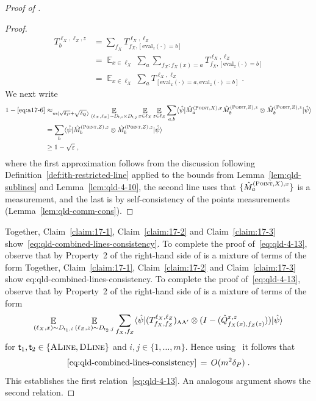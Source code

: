 \documentclass[11pt]{article}
\theoremstyle{definition}
\newcommand{\ket}[1]{|#1\rangle}
\newcommand{\bra}[1]{\langle#1|}
\DeclareMathOperator*{\Expectation}{\mathbb{E}}
\newcommand{\Es}[1]{\Expectation_{#1}}
\newcommand{\ot}{\otimes}
\newcommand{\eps}{\varepsilon}
\newcommand{\E}{\mathop{\mathbb{E}}\displaylimits}
\newcommand{\labelstyle}[1]{\ensuremath{\textsc{#1}}\xspace}
\newcommand{\tvarstyle}[1]{\mathsf{#1}}
\newcommand{\tvar}{\ensuremath{\tvarstyle{t}}}
\newcommand{\alice}{\labelstyle{A}}
\newcommand{\typestyle}[1]{\ensuremath{\textsc{#1}}\xspace}
\renewcommand{\line}{\mathbf{\ell}}
\newcommand{\Point}{\typestyle{Point}}
\newcommand{\ALine}{\typestyle{ALine}}
\newcommand{\DLine}{\typestyle{DLine}}
\newcommand{\eval}{\mathrm{eval}}
\begin{document}
\begin{proof}[Proof of ]
\begin{proof}
\begin{align*}
T^{\line_X, \line_Z, z}_{b}&= \sum_{f_X} T^{\line_X, \line_Z}_{f_X,[\eval_z(\cdot)=b]}\\
&= \Es{x \in \line_X} \sum_a \sum_{f_X: f_X(x)=a} T^{\line_X, \line_Z}_{f_X,[\eval_z(\cdot)=b]}\\
&= \Es{x \in \line_X} \sum_a  T^{\line_X, \line_Z}_{[\eval_x(\cdot)=a,\eval_z(\cdot)=b]}\;.
\end{align*}
We next write
\begin{align*}
1-\eqref{eq:a17-6}&\approx_{m(\sqrt{\delta_P}+\sqrt{\delta_Q})}\E_{(\line_X,\line_Z)\sim D_{\tvar,i}\times D_{\tvar,j}}\E_{x\in \line_X} \E_{z\in \line_Z } \sum_{a,b} \bra{\hat{\psi}} \hat{M}^{(\Point,X),x}_{a}\hat{M}^{(\Point,Z),z}_{b}  \ot \hat{M}^{(\Point,Z),z}_{b} \ket{\hat{\psi}} \\
&= \sum_{b} \bra{\hat{\psi}} \hat{M}^{(\Point,Z),z}_{b}  \ot \hat{M}^{(\Point,Z),z}_{b} \ket{\hat{\psi}} \\
&\geq 1-\sqrt{\eps}\;,
\end{align*}
where the first approximation follows from the discussion following Definition~\ref{def:ith-restricted-line} applied to the bounds from Lemma~\ref{lem:qld-sublines} and Lemma~\ref{lem:qld-4-10}, the second line uses that $\{\hat{M}^{(\Point,X),x}_{a}\}$ is a measurement, and the last is by self-consistency of the points measurements (Lemma~\ref{lem:qld-comm-cons}).
\end{proof}

Together, Claim~\ref{claim:17-1}, Claim~\ref{claim:17-2} and Claim~\ref{claim:17-3} show~\eqref{eq:qld-combined-lines-consistency}. To complete the proof of~\eqref{eq:qld-4-13}, observe that by Property~2 of  the right-hand side of  is a mixture of terms of the form
Together, Claim~\ref{claim:17-1}, Claim~\ref{claim:17-2} and Claim~\ref{claim:17-3} show {eq:qld-combined-lines-consistency}. To complete the proof of~\eqref{eq:qld-4-13}, observe that by Property~2 of  the right-hand side of  is a mixture of terms of the form
\[ \E_{(\line_X, x) \sim D_{\tvar_1, i}} \E_{(\line_Z, z) \sim D_{\tvar_2, j}} \sum_{f_X, f_Z} \bra{\hat{\psi}} (T^{\line_X, \line_Z}_{f_X, f_Z})_{\alice \alice'} \ot (I - (\hat{Q}^{x,z}_{f_X(x), f_Z(z)})) \ket{\hat{\psi}} \]
for $\tvar_1, \tvar_2 \in \{\ALine, \DLine\}$ and $i, j \in \{1, \dots, m\}$. Hence using~ it follows that
\[ \eqref{eq:qld-combined-lines-consistency} \,=\, O(m^2 \delta_P)\;. \]
This establishes the first relation~\eqref{eq:qld-4-13}. An analogous argument shows the second relation.
















	
\end{proof}
\end{document}
